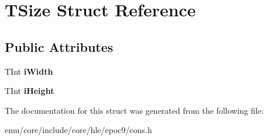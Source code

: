 \hypertarget{struct_t_size}{}\section{T\+Size Struct Reference}
\label{struct_t_size}
\subsection*{Public Attributes}
\begin{DoxyCompactItemize}
\item 
\mbox{\label{struct_t_size_a00ce42419fc694db4dbfe1ae6151352b}} 
T\+Int {\bfseries i\+Width}
\item 
\mbox{\label{struct_t_size_a1ee0fdaa545661698ff6c72e8f53696a}} 
T\+Int {\bfseries i\+Height}
\end{DoxyCompactItemize}


The documentation for this struct was generated from the following file\+:\begin{DoxyCompactItemize}
\item 
emu/core/include/core/hle/epoc9/cons.\+h\end{DoxyCompactItemize}
